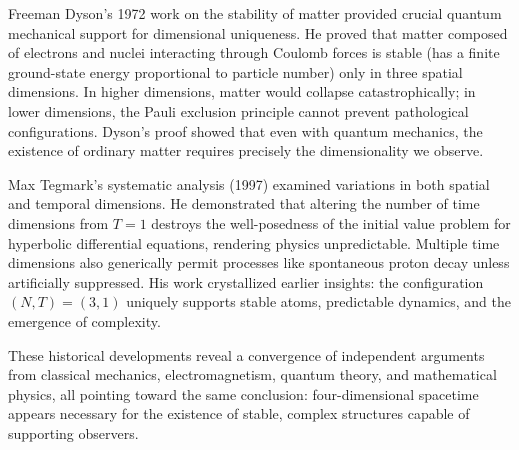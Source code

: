 \begin{historical}
    Freeman Dyson's 1972 work on the stability of matter provided crucial quantum mechanical support for dimensional uniqueness. He proved that matter composed of electrons and nuclei interacting through Coulomb forces is stable (has a finite ground-state energy proportional to particle number) only in three spatial dimensions. In higher dimensions, matter would collapse catastrophically; in lower dimensions, the Pauli exclusion principle cannot prevent pathological configurations. Dyson's proof showed that even with quantum mechanics, the existence of ordinary matter requires precisely the dimensionality we observe.
    
    Max Tegmark's systematic analysis (1997) examined variations in both spatial and temporal dimensions. He demonstrated that altering the number of time dimensions from $T = 1$ destroys the well-posedness of the initial value problem for hyperbolic differential equations, rendering physics unpredictable. Multiple time dimensions also generically permit processes like spontaneous proton decay unless artificially suppressed. His work crystallized earlier insights: the configuration $(N,T) = (3,1)$ uniquely supports stable atoms, predictable dynamics, and the emergence of complexity.
    
    These historical developments reveal a convergence of independent arguments from classical mechanics, electromagnetism, quantum theory, and mathematical physics, all pointing toward the same conclusion: four-dimensional spacetime appears necessary for the existence of stable, complex structures capable of supporting observers.
    \end{historical}